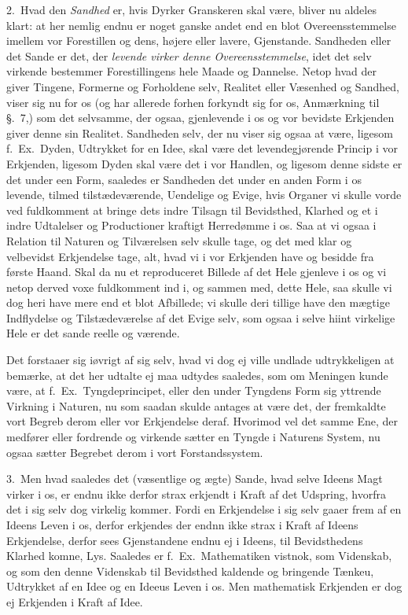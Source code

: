 \documentclass[12pt,a4paper]{book}
\newcommand{\apage}[1]{\marginnote{\footnotesize\textit{[#1]}}}
\begin{document}
2.~Hvad den \emph{Sandhed} er, hvis Dyrker Granskeren skal være, bliver nu
aldeles klart: at her nemlig endnu er noget ganske andet end en blot
Overeensstemmelse imellem vor Forestillen og dens, højere eller lavere,
Gjenstande. Sandheden eller det Sande er det, der \emph{levende virker denne
Overeensstemmelse}, idet det selv virkende bestemmer Forestillingens hele Maade
og Dannelse. Netop hvad der giver Tingene, Formerne og Forholdene selv, Realitet
eller Væsenhed og Sandhed, viser sig nu for os (og har allerede forhen forkyndt
sig for os, Anmærkning til §.~7,) som det selvsamme, der ogsaa, gjenlevende i os
og vor bevidste Erkjenden giver denne sin Realitet. Sandheden selv, der nu viser
sig ogsaa at være, ligesom f.~Ex.\ Dyden, Udtrykket for en Idee, skal være det
levendegjørende Princip i vor Erkjenden, ligesom Dyden skal være det i vor
Handlen, og ligesom denne sidste er det under een Form, saaledes er Sandheden det
under en anden Form i os levende, tilmed tilstædeværende, Uendelige og Evige,
hvis Organer vi skulle vorde ved fuldkomment at bringe dets indre Tilsagn til
Bevidsthed, \apage{114}  Klarhed og et i indre Udtalelser og Productioner kraftigt Herredømme
i os. Saa at vi ogsaa i Relation til Naturen og Tilværelsen selv skulle tage, og
det med klar og velbevidst Erkjendelse tage, alt, hvad vi i vor Erkjenden have og
besidde fra første Haand. Skal da nu et reproduceret Billede af det Hele gjenleve
i os og vi netop derved voxe fuldkomment ind i, og sammen med, dette Hele, saa
skulle vi dog heri have mere end et blot Afbillede; vi skulle deri tillige have
den mægtige Indflydelse og Tilstædeværelse af det Evige selv, som ogsaa i selve
hiint virkelige Hele er det sande reelle og værende.

Det forstaaer sig iøvrigt af sig selv, hvad vi dog ej ville undlade udtrykkeligen
at bemærke, at det her udtalte ej maa udtydes saaledes, som om Meningen kunde
være, at f.~Ex.\ Tyngdeprincipet, eller den under Tyngdens Form sig yttrende
Virkning i Naturen, nu som saadan skulde antages at være det, der fremkaldte vort
Begreb derom eller vor Erkjendelse deraf. Hvorimod vel det samme Ene, der
medfører eller fordrende og virkende sætter en Tyngde i Naturens System, nu ogsaa
sætter Begrebet derom i vort Forstandssystem.

3.~Men hvad saaledes det (væsentlige og ægte) Sande, hvad selve Ideens Magt
virker i os, er endnu ikke derfor strax erkjendt i Kraft af det Udspring, hvorfra
det i sig selv dog virkelig  \apage{115} kommer. Fordi en Erkjendelse i sig selv gaaer frem af
en Ideens Leven i os, derfor erkjendes der endnn ikke strax i Kraft af Ideens
Erkjendelse, derfor sees Gjenstandene endnu ej i Ideens, til Bevidsthedens
Klarhed komne, Lys. Saaledes er f.~Ex.\ Mathematiken vistnok, som Videnskab, og
som den denne Videnskab til Bevidsthed kaldende og bringende Tænkeu, Udtrykket af
en Idee og en Ideeus Leven i os. Men mathematisk Erkjenden er dog ej Erkjenden i
Kraft af Idee.
\end{document}
